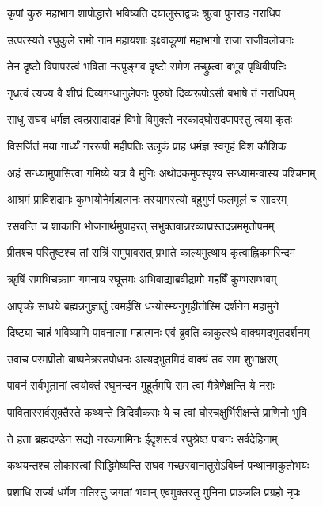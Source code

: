 \twolineshloka
{कृपां कुरु महाभाग शापोद्धारो भविष्यति}
{दयालुस्तद्वचः श्रुत्वा पुनराह नराधिप}%

\twolineshloka
{उत्पत्स्यते रघुकुले रामो नाम महायशाः}
{इक्ष्वाकूणां महाभागो राजा राजीवलोचनः}%

\twolineshloka
{तेन दृष्टो विपापस्त्वं भविता नरपुङ्गव}
{दृष्टो रामेण तच्छ्रुत्वा बभूव पृथिवीपतिः}%

\twolineshloka
{गृध्रत्वं त्यज्य वै शीघ्रं दिव्यगन्धानुलेपनः}
{पुरुषो दिव्यरूपोऽसौ बभाषे तं नराधिपम्}%

\twolineshloka
{साधु राघव धर्मज्ञ त्वत्प्रसादादहं विभो}
{विमुक्तो नरकाद्घोरादपापस्तु त्वया कृतः}%

\twolineshloka
{विसर्जितं मया गार्ध्यं नररूपी महीपतिः}
{उलूकं प्राह धर्मज्ञ स्वगृहं विश कौशिक}%

\twolineshloka
{अहं सन्ध्यामुपासित्वा गमिष्ये यत्र वै मुनिः}
{अथोदकमुपस्पृश्य सन्ध्यामन्वास्य पश्चिमाम्}%

\twolineshloka
{आश्रमं प्राविशद्रामः कुम्भयोनेर्महात्मनः}
{तस्यागस्त्यो बहुगुणं फलमूलं च सादरम्}%

\twolineshloka
{रसवन्ति च शाकानि भोजनार्थमुपाहरत्}
{सभुक्तवान्नरव्याघ्रस्तदन्नममृतोपमम्}%

\twolineshloka
{प्रीतश्च परितुष्टश्च तां रात्रिं समुपावसत्}
{प्रभाते काल्यमुत्थाय कृत्वाह्निकमरिन्दम}%

\twolineshloka
{ॠषिं समभिचक्राम गमनाय रघूत्तमः}
{अभिवाद्याब्रवीद्रामो महर्षिं कुम्भसम्भवम्}%

\twolineshloka
{आपृच्छे साधये ब्रह्मन्ननुज्ञातुं त्वमर्हसि}
{धन्योस्म्यनुगृहीतोस्मि दर्शनेन महामुने}%

\twolineshloka
{दिष्ट्या चाहं भविष्यामि पावनात्मा महात्मनः}
{एवं ब्रुवति काकुत्स्थे वाक्यमद्भुतदर्शनम्}%

\twolineshloka
{उवाच परमप्रीतो बाष्पनेत्रस्तपोधनः}
{अत्यद्भुतमिदं वाक्यं तव राम शुभाक्षरम्}%

\twolineshloka
{पावनं सर्वभूतानां त्वयोक्तं रघुनन्दन}
{मुहूर्तमपि राम त्वां मैत्रेणेक्षन्ति ये नराः}%

\twolineshloka
{पावितास्सर्वसूक्तैस्ते कथ्यन्ते त्रिदिवौकसः}
{ये च त्वां घोरचक्षुर्भिरीक्षन्ते प्राणिनो भुवि}%

\twolineshloka
{ते हता ब्रह्मदण्डेन सद्यो नरकगामिनः}
{ईदृशस्त्वं रघुश्रेष्ठ पावनः सर्वदेहिनाम्}%

\twolineshloka
{कथयन्तश्च लोकास्त्वां सिद्धिमेष्यन्ति राघव}
{गच्छस्वानातुरोऽविघ्नं पन्थानमकुतोभयः}%

\twolineshloka
{प्रशाधि राज्यं धर्मेण गतिस्तु जगतां भवान्}
{एवमुक्तस्तु मुनिना प्राञ्जलि प्रग्रहो नृपः}%

